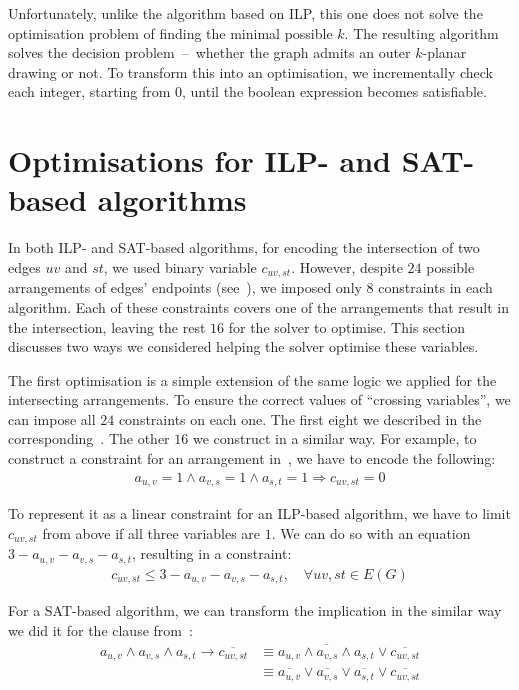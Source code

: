 Unfortunately, unlike the algorithm based on ILP, this one does not solve the optimisation problem of finding the minimal possible \(k\). The resulting algorithm solves the decision problem~--~whether the graph admits an outer \(k\)-planar drawing or not. To transform this into an optimisation, we incrementally check each integer, starting from \(0\), until the boolean expression becomes satisfiable.


\section{Optimisations for ILP- and SAT-based algorithms}\label{sec:optimisations}

In both ILP- and SAT-based algorithms, for encoding the intersection of two edges \(uv\) and \(st\), we used binary variable \(c_{uv, st}\). However, despite \(24\) possible arrangements of edges' endpoints (see~), we imposed only \(8\) constraints in each algorithm. Each of these constraints covers one of the arrangements that result in the intersection, leaving the rest \(16\) for the solver to optimise. This section discusses two ways we considered helping the solver optimise these variables.

The first optimisation is a simple extension of the same logic we applied for the intersecting arrangements. To ensure the correct values of ``crossing variables'', we can impose all \(24\) constraints on each one. The first eight we described in the corresponding~. The other \(16\) we construct in a similar way. For example, to construct a constraint for an arrangement in~, we have to encode the following:
\begin{gather*}
    a_{u,v} = 1 \land a_{v,s} = 1 \land a_{s,t} = 1 \Longrightarrow c_{uv, st} = 0
\end{gather*}

To represent it as a linear constraint for an ILP-based algorithm, we have to limit \(c_{uv, st}\) from above if all three variables are \(1\). We can do so with an equation \(3 - a_{u,v} - a_{v,s} - a_{s,t}\), resulting in a constraint:
\begin{gather*}
    c_{uv, st} \leqslant 3 - a_{u,v} - a_{v,s} - a_{s,t},\quad\forall uv, st \in E(G)
\end{gather*}

For a SAT-based algorithm, we can transform the implication in the similar way we did it for the clause from~:
\begin{align*}
    a_{u,v} \land a_{v,s} \land a_{s,t} \rightarrow \overline{c_{uv, st}}
    & \equiv \overline{a_{u,v} \land a_{v,s} \land a_{s,t}} \lor \overline{c_{uv, st}} \\
    & \equiv \overline{a_{u,v}} \lor \overline{a_{v,s}} \lor \overline{a_{s,t}} \lor \overline{c_{uv, st}}
\end{align*}

